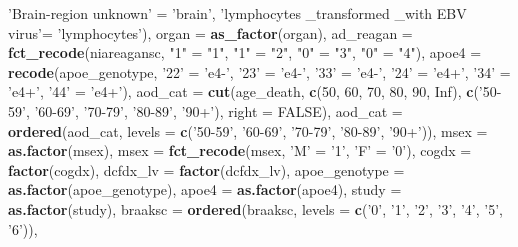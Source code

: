 \documentclass[]{book}
\newenvironment{Shaded}{\begin{snugshade}}{\end{snugshade}}
\newcommand{\DataTypeTok}[1]{\textcolor[rgb]{0.13,0.29,0.53}{#1}}
\newcommand{\DecValTok}[1]{\textcolor[rgb]{0.00,0.00,0.81}{#1}}
\newcommand{\KeywordTok}[1]{\textcolor[rgb]{0.13,0.29,0.53}{\textbf{#1}}}
\newcommand{\NormalTok}[1]{#1}
\newcommand{\OtherTok}[1]{\textcolor[rgb]{0.56,0.35,0.01}{#1}}
\newcommand{\StringTok}[1]{\textcolor[rgb]{0.31,0.60,0.02}{#1}}
\begin{document}
\begin{Shaded}
\begin{Highlighting}[]
{{{{{{{{{                       \StringTok{'Brain-region unknown'}\NormalTok{ =}\StringTok{ 'brain'}\NormalTok{, }
                       \StringTok{'lymphocytes _transformed _with EBV virus'}\NormalTok{=}\StringTok{ 'lymphocytes'}\NormalTok{),}
        \DataTypeTok{organ =} \KeywordTok{as_factor}\NormalTok{(organ),}
        \DataTypeTok{ad_reagan =} \KeywordTok{fct_recode}\NormalTok{(niareagansc, }\StringTok{"1"}\NormalTok{ =}\StringTok{ "1"}\NormalTok{, }\StringTok{"1"}\NormalTok{ =}\StringTok{ "2"}\NormalTok{, }\StringTok{"0"}\NormalTok{ =}\StringTok{ "3"}\NormalTok{, }\StringTok{"0"}\NormalTok{ =}\StringTok{ "4"}\NormalTok{),}
        \DataTypeTok{apoe4 =} \KeywordTok{recode}\NormalTok{(apoe_genotype, }\StringTok{'22'}\NormalTok{ =}\StringTok{ 'e4-'}\NormalTok{, }\StringTok{'23'}\NormalTok{ =}\StringTok{ 'e4-'}\NormalTok{, }\StringTok{'33'}\NormalTok{ =}\StringTok{ 'e4-'}\NormalTok{, }\StringTok{'24'}\NormalTok{ =}\StringTok{ 'e4+'}\NormalTok{, }\StringTok{'34'}\NormalTok{ =}\StringTok{ 'e4+'}\NormalTok{, }\StringTok{'44'}\NormalTok{ =}\StringTok{ 'e4+'}\NormalTok{),}
        \DataTypeTok{aod_cat =} \KeywordTok{cut}\NormalTok{(age_death, }\KeywordTok{c}\NormalTok{(}\DecValTok{50}\NormalTok{, }\DecValTok{60}\NormalTok{, }\DecValTok{70}\NormalTok{, }\DecValTok{80}\NormalTok{, }\DecValTok{90}\NormalTok{, }\OtherTok{Inf}\NormalTok{), }\KeywordTok{c}\NormalTok{(}\StringTok{'50-59'}\NormalTok{, }\StringTok{'60-69'}\NormalTok{, }\StringTok{'70-79'}\NormalTok{, }\StringTok{'80-89'}\NormalTok{, }\StringTok{'90+'}\NormalTok{), }\DataTypeTok{right =} \OtherTok{FALSE}\NormalTok{),}
        \DataTypeTok{aod_cat =} \KeywordTok{ordered}\NormalTok{(aod_cat, }\DataTypeTok{levels =} \KeywordTok{c}\NormalTok{(}\StringTok{'50-59'}\NormalTok{, }\StringTok{'60-69'}\NormalTok{, }\StringTok{'70-79'}\NormalTok{, }\StringTok{'80-89'}\NormalTok{, }\StringTok{'90+'}\NormalTok{)), }
        \DataTypeTok{msex =} \KeywordTok{as.factor}\NormalTok{(msex), }
        \DataTypeTok{msex =} \KeywordTok{fct_recode}\NormalTok{(msex, }\StringTok{'M'}\NormalTok{ =}\StringTok{ '1'}\NormalTok{, }\StringTok{'F'}\NormalTok{ =}\StringTok{ '0'}\NormalTok{),}
        \DataTypeTok{cogdx =} \KeywordTok{factor}\NormalTok{(cogdx), }
        \DataTypeTok{dcfdx_lv =} \KeywordTok{factor}\NormalTok{(dcfdx_lv),}
        \DataTypeTok{apoe_genotype =} \KeywordTok{as.factor}\NormalTok{(apoe_genotype), }
        \DataTypeTok{apoe4 =} \KeywordTok{as.factor}\NormalTok{(apoe4), }
        \DataTypeTok{study =} \KeywordTok{as.factor}\NormalTok{(study), }
        \DataTypeTok{braaksc =} \KeywordTok{ordered}\NormalTok{(braaksc, }\DataTypeTok{levels =} \KeywordTok{c}\NormalTok{(}\StringTok{'0'}\NormalTok{, }\StringTok{'1'}\NormalTok{, }\StringTok{'2'}\NormalTok{, }\StringTok{'3'}\NormalTok{, }\StringTok{'4'}\NormalTok{, }\StringTok{'5'}\NormalTok{, }\StringTok{'6'}\NormalTok{)), }
}}}}}}}}}
\end{Highlighting}
\end{Shaded}
\end{document}

